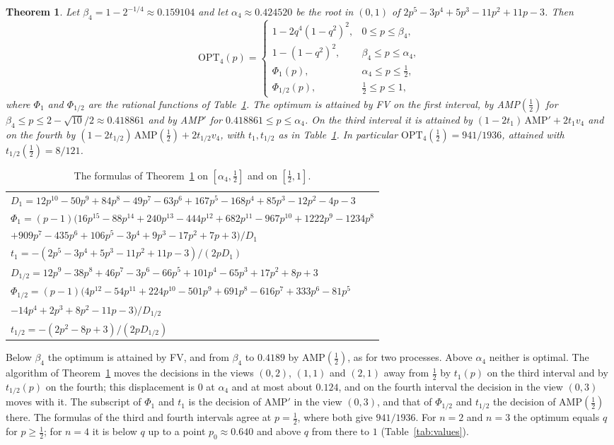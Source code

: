\documentclass[11pt]{article}
\newtheorem{theorem}{Theorem}
\newcommand{\OPT}{\mathrm{OPT}}
\newcommand{\h}{\tfrac12}
\begin{document}
\begin{theorem}\label{thm:four}
Let $\beta_4=1-2^{-1/4}\approx0.159104$ and let $\alpha_4\approx0.424520$ be the root in $(0,1)$ of $2p^5-3p^4+5p^3-11p^2+11p-3$. Then
\[
\OPT_4(p)=\begin{cases}
1-2q^4(1-q^2)^2, & 0\le p\le\beta_4,\\
1-(1-q^2)^2, & \beta_4\le p\le\alpha_4,\\
\Phi_1(p), & \alpha_4\le p\le\h,\\
\Phi_{1/2}(p), & \h\le p\le1,
\end{cases}
\]
where $\Phi_1$ and $\Phi_{1/2}$ are the rational functions of Table~\ref{tab:four}. The optimum is attained by FV on the first interval, by AMP$(\h)$ for $\beta_4\le p\le 2-\sqrt{10}/2\approx0.418861$ and by AMP$'$ for $0.418861\le p\le\alpha_4$. On the third interval it is attained by $(1-2t_1)\,\mathrm{AMP}'+2t_1v_4$ and on the fourth by $(1-2t_{1/2})\,\mathrm{AMP}(\h)+2t_{1/2}v_4$, with $t_1,t_{1/2}$ as in Table~\ref{tab:four}. In particular $\OPT_4(\h)=941/1936$, attained with $t_{1/2}(\h)=8/121$.
\end{theorem}

\begin{table}[t]
\centering
\small
\begin{tabular}{l}
\toprule
$D_1=12p^{10}-50p^9+84p^8-49p^7-63p^6+167p^5-168p^4+85p^3-12p^2-4p-3$\\
$\Phi_1=(p-1)(16p^{15}-88p^{14}+240p^{13}-444p^{12}+682p^{11}-967p^{10}+1222p^9-1234p^8$\\
\qquad$+909p^7-435p^6+106p^5-3p^4+9p^3-17p^2+7p+3)/D_1$\\
$t_1=-(2p^5-3p^4+5p^3-11p^2+11p-3)/(2pD_1)$\\
\midrule
$D_{1/2}=12p^9-38p^8+46p^7-3p^6-66p^5+101p^4-65p^3+17p^2+8p+3$\\
$\Phi_{1/2}=(p-1)(4p^{12}-54p^{11}+224p^{10}-501p^9+691p^8-616p^7+333p^6-81p^5$\\
\qquad$-14p^4+2p^3+8p^2-11p-3)/D_{1/2}$\\
$t_{1/2}=-(2p^2-8p+3)/(2pD_{1/2})$\\
\bottomrule
\end{tabular}
\caption{The formulas of Theorem~\ref{thm:four} on $[\alpha_4,\h]$ and on $[\h,1]$.}\label{tab:four}
\end{table}

Below $\beta_4$ the optimum is attained by FV, and from $\beta_4$ to $0.4189$ by AMP$(\h)$, as for two processes. Above $\alpha_4$ neither is optimal. The algorithm of Theorem~\ref{thm:four} moves the decisions in the views $(0,2)$, $(1,1)$ and $(2,1)$ away from $\h$ by $t_1(p)$ on the third interval and by $t_{1/2}(p)$ on the fourth; this displacement is $0$ at $\alpha_4$ and at most about $0.124$, and on the fourth interval the decision in the view $(0,3)$ moves with it. The subscript of $\Phi_1$ and $t_1$ is the decision of $\mathrm{AMP}'$ in the view $(0,3)$, and that of $\Phi_{1/2}$ and $t_{1/2}$ the decision of AMP$(\h)$ there. The formulas of the third and fourth intervals agree at $p=\h$, where both give $941/1936$. For $n=2$ and $n=3$ the optimum equals $q$ for $p\ge\h$; for $n=4$ it is below $q$ up to a point $p_0\approx0.640$ and above $q$ from there to $1$ (Table~\ref{tab:values}).
\end{document}
